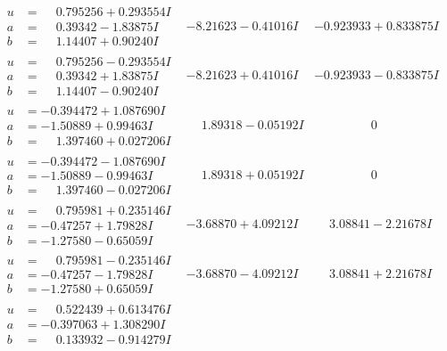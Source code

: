\documentclass[1p]{elsarticle_modified}
\theoremstyle{definition}
\begin{document}
$$\begin{array}{c|c|c}
\begin{aligned}
u &= \phantom{-}0.795256 + 0.293554 I \\
a &= \phantom{-}0.39342 - 1.83875 I \\
b &= \phantom{-}1.14407 + 0.90240 I\end{aligned}
 & -8.21623 - 0.41016 I & -0.923933 + 0.833875 I \\ \hline\begin{aligned}
u &= \phantom{-}0.795256 - 0.293554 I \\
a &= \phantom{-}0.39342 + 1.83875 I \\
b &= \phantom{-}1.14407 - 0.90240 I\end{aligned}
 & -8.21623 + 0.41016 I & -0.923933 - 0.833875 I \\ \hline\begin{aligned}
u &= -0.394472 + 1.087690 I \\
a &= -1.50889 + 0.99463 I \\
b &= \phantom{-}1.397460 + 0.027206 I\end{aligned}
 & \phantom{-}1.89318 - 0.05192 I & \phantom{-0.000000 } 0 \\ \hline\begin{aligned}
u &= -0.394472 - 1.087690 I \\
a &= -1.50889 - 0.99463 I \\
b &= \phantom{-}1.397460 - 0.027206 I\end{aligned}
 & \phantom{-}1.89318 + 0.05192 I & \phantom{-0.000000 } 0 \\ \hline\begin{aligned}
u &= \phantom{-}0.795981 + 0.235146 I \\
a &= -0.47257 + 1.79828 I \\
b &= -1.27580 - 0.65059 I\end{aligned}
 & -3.68870 + 4.09212 I & \phantom{-}3.08841 - 2.21678 I \\ \hline\begin{aligned}
u &= \phantom{-}0.795981 - 0.235146 I \\
a &= -0.47257 - 1.79828 I \\
b &= -1.27580 + 0.65059 I\end{aligned}
 & -3.68870 - 4.09212 I & \phantom{-}3.08841 + 2.21678 I \\ \hline\begin{aligned}
u &= \phantom{-}0.522439 + 0.613476 I \\
a &= -0.397063 + 1.308290 I \\
b &= \phantom{-}0.133932 - 0.914279 I\end{aligned}

\end{array}$$
\end{document}
